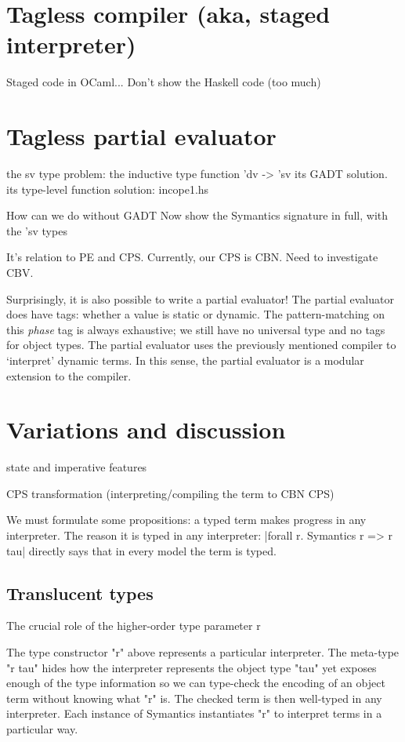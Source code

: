 \documentclass[preprint]{sigplanconf}
\begin{document}
\section{Tagless compiler (aka, staged interpreter)}
Staged code in OCaml... Don't show the Haskell code (too much)


\section{Tagless partial evaluator}

the sv type problem: the inductive type function 'dv -> 'sv
its GADT solution. 
its type-level function solution: incope1.hs 

How can we do without GADT
Now show the Symantics signature in full, with the 'sv types

It's relation to PE and CPS. Currently, our CPS is CBN. Need to
investigate CBV.


Surprisingly, it is also possible to write a partial evaluator!  The
partial evaluator does have tags: whether a value is static or dynamic.
The pattern-matching on this \emph{phase} tag is always exhaustive; we still
have no universal type and no tags for object types.  The partial
evaluator uses the previously mentioned compiler to `interpret' dynamic
terms.  In this sense, the partial evaluator is a modular extension to
the compiler.


\section{Variations and discussion}

state and imperative features

CPS transformation (interpreting/compiling the term to CBN CPS)

We must formulate some propositions: a typed term makes progress in
any interpreter. The reason it is typed in any interpreter:
|forall r. Symantics r => r tau| directly says that in every model the
term is typed. 

\subsection{Translucent types}
The crucial role of the higher-order type parameter r

The type constructor "r" above represents a particular interpreter.  The
meta-type "r tau" hides how the interpreter represents the object type
"tau" yet exposes enough of the type information so we can type-check
the encoding of an object term without knowing what "r" is.  The checked
term is then well-typed in any interpreter.  Each instance of Symantics
instantiates "r" to interpret terms in a particular way.
\end{document}
